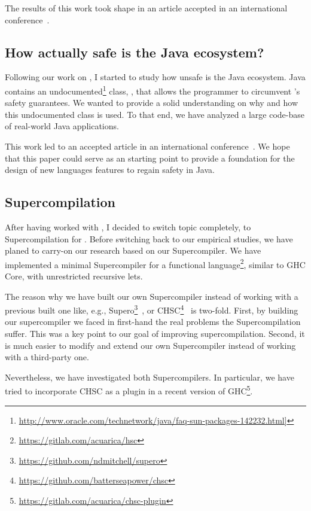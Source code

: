 The results of this work took shape in an article accepted in an international conference~\cite{Mastrangelo:2014:JJN:2647508.2647516}.

\subsection*{How actually safe is the Java ecosystem?}

Following our work on \jnif{}, I started to study how unsafe is the Java ecosystem.
Java contains an undocumented\footnote{\url{http://www.oracle.com/technetwork/java/faq-sun-packages-142232.html]}} class, \smu{}, that allows the programmer to circumvent \java{}'s safety guarantees.
We wanted to provide a solid understanding on why and how this undocumented class is used.
To that end, we have analyzed a large code-base of real-world Java applications.

This work led to an accepted article in an international conference~\cite{Mastrangelo:2015:UYO:2814270.2814313}.
We hope that this paper could serve as an starting point to provide a foundation for the design of new languages features to regain safety in Java.

\subsection*{Supercompilation}

After having worked with \java{}, I decided to switch topic completely, to Supercompilation for \haskell{}.
Before switching back to our empirical studies,
we have planed to carry-on our research based on our Supercompiler.
We have implemented a minimal Supercompiler for a functional language\footnote{\url{https://gitlab.com/acuarica/hsc}}, similar to GHC Core, with unrestricted recursive lets.

The reason why we have built our own Supercompiler instead of working with a previous built one like, e.g., Supero\footnote{\url{https://github.com/ndmitchell/supero}}~\cite{Mitchell2008,Mitchell:2010:RS:1863543.1863588}, or CHSC\footnote{\url{https://github.com/batterseapower/chsc}}~\cite{Bolingbroke:2010:SE:1863523.1863540} is two-fold.
First, by building our supercompiler we faced in first-hand the real problems the Supercompilation suffer. This was a key point to our goal of improving supercompilation.
Second, it is much easier to modify and extend our own Supercompiler instead of working with a third-party one.

Nevertheless, we have investigated both Supercompilers. In particular, we have tried to incorporate CHSC as a plugin in a recent version of GHC\footnote{\url{https://gitlab.com/acuarica/chsc-plugin}}.

